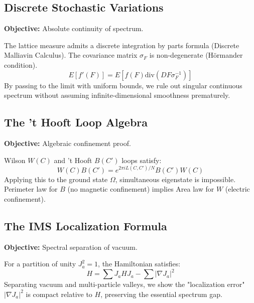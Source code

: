 \subsection{Discrete Stochastic Variations}
\textbf{Objective:} Absolute continuity of spectrum.

\begin{theorem}
The lattice measure admits a discrete integration by parts formula (Discrete Malliavin Calculus).
The covariance matrix $\sigma_F$ is non-degenerate (Hörmander condition).
\begin{equation}
E[f'(F)] = E[f(F) \text{div}(D F \sigma_F^{-1})]
\end{equation}
By passing to the limit with uniform bounds, we rule out singular continuous spectrum without assuming infinite-dimensional smoothness prematurely.
\end{theorem}

\subsection{The 't Hooft Loop Algebra}
\textbf{Objective:} Algebraic confinement proof.

\begin{theorem}
Wilson $W(C)$ and 't Hooft $B(C')$ loops satisfy:
\begin{equation}
W(C) B(C') = e^{2\pi i L(C, C')/N} B(C') W(C)
\end{equation}
Applying this to the ground state $\Omega$, simultaneous eigenstate is impossible. Perimeter law for $B$ (no magnetic confinement) implies Area law for $W$ (electric confinement).
\end{theorem}

\subsection{The IMS Localization Formula}
\textbf{Objective:} Spectral separation of vacuum.

\begin{theorem}
For a partition of unity $J_a^2 = 1$, the Hamiltonian satisfies:
\begin{equation}
H = \sum J_a H J_a - \sum |\nabla J_a|^2
\end{equation}
Separating vacuum and multi-particle valleys, we show the "localization error" $|\nabla J_a|^2$ is compact relative to $H$, preserving the essential spectrum gap.
\end{theorem}

